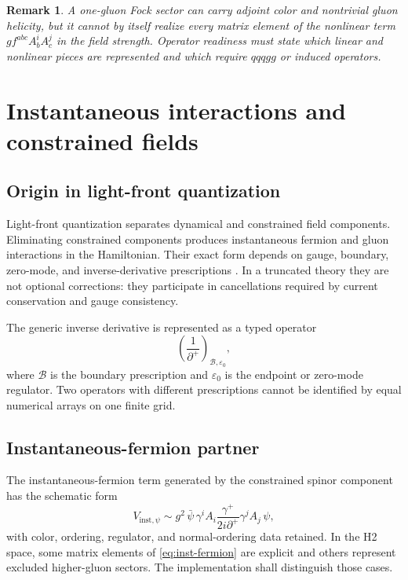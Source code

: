 \documentclass[11pt]{article}
\newtheorem{remark}[definition]{Remark}
\newcommand{\cB}{\mathcal B}
\newcommand{\eps}{\varepsilon}
\begin{document}
\begin{remark}
A one-gluon Fock sector can carry adjoint color and nontrivial gluon helicity,
but it cannot by itself realize every matrix element of the nonlinear term
\(g f^{abc}A_b^iA_c^j\) in the field strength.  Operator readiness must state
which linear and nonlinear pieces are represented and which require
\(qqqgg\) or induced operators.
\end{remark}

\section{Instantaneous interactions and constrained fields}

\subsection{Origin in light-front quantization}

Light-front quantization separates dynamical and constrained field components.
Eliminating constrained components produces instantaneous fermion and gluon
interactions in the Hamiltonian.  Their exact form depends on gauge,
boundary, zero-mode, and inverse-derivative prescriptions
\cite{BrodskyPauliPinsky1998}.  In a truncated theory they are not optional
corrections: they participate in cancellations required by current
conservation and gauge consistency.

The generic inverse derivative is represented as a typed operator
\begin{equation}
 \left(\frac{1}{\partial^+}\right)_{\cB,\eps_0},
\end{equation}
where \(\cB\) is the boundary prescription and \(\eps_0\) is the endpoint or
zero-mode regulator.  Two operators with different prescriptions cannot be
identified by equal numerical arrays on one finite grid.

\subsection{Instantaneous-fermion partner}

The instantaneous-fermion term generated by the constrained spinor component
has the schematic form
\begin{equation}
 V_{\mathrm{inst},\psi}
 \sim
 g^2\,
 \bar\psi\,\gamma^i A_i
 \frac{\gamma^+}{2i\partial^+}
 \gamma^j A_j\,\psi,
 \label{eq:inst-fermion}
\end{equation}
with color, ordering, regulator, and normal-ordering data retained.  In the H2
space, some matrix elements of \cref{eq:inst-fermion} are explicit and others
represent excluded higher-gluon sectors.  The implementation shall distinguish
those cases.
\end{document}
